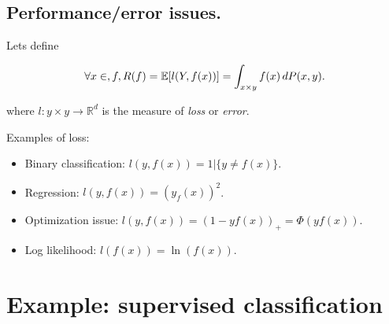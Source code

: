 		\subsection{Performance/error issues.}

			Lets define

			\[ \forall x \in, \mathnormal{f}, R(f)=\mathbb{E}[l(Y,f(x))] =  \int_{x{\times}y} f(x)\,dP(x,y).\] 

			where $l:y{\times}y \rightarrow \mathbb{R}^d$ is the measure of \emph{loss} or \emph{error}.
			
			Examples of loss:
					\begin{itemize}
							\item Binary classification: $l(y,f(x)) = 1|\{y \neq f(x)\}$.
							\item Regression: $l(y,f(x))=(y_f(x))^2$.
							\item Optimization issue: $l(y,f(x))=(1-yf(x))_+ = \Phi(yf(x))$.
							\item Log likelihood: $l(f(x))=\ln(f(x))$.
					\end{itemize}

	\section{Example: supervised classification}
